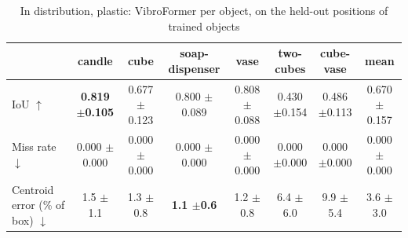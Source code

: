 \begin{table}
\caption{In distribution, plastic: VibroFormer per object, on the held-out positions of trained objects}
\label{tab:id_plastic}
\begin{tabular}{l!{\vrule width 1.2pt}cccccc!{\vrule width 1.2pt}c}
\toprule
 & candle & cube & soap-dispenser & vase & two-cubes & cube-vase & mean \\
\midrule
IoU $\uparrow$ & \bfseries 0.819 {\scriptsize $\pm$0.105} & 0.677 {\scriptsize $\pm$0.123} & 0.800 {\scriptsize $\pm$0.089} & 0.808 {\scriptsize $\pm$0.088} & 0.430 {\scriptsize $\pm$0.154} & 0.486 {\scriptsize $\pm$0.113} & 0.670 {\scriptsize $\pm$0.157} \\
Miss rate $\downarrow$ & 0.000 {\scriptsize $\pm$0.000} & 0.000 {\scriptsize $\pm$0.000} & 0.000 {\scriptsize $\pm$0.000} & 0.000 {\scriptsize $\pm$0.000} & 0.000 {\scriptsize $\pm$0.000} & 0.000 {\scriptsize $\pm$0.000} & 0.000 {\scriptsize $\pm$0.000} \\
Centroid error (\% of box) $\downarrow$ & 1.5 {\scriptsize $\pm$1.1} & 1.3 {\scriptsize $\pm$0.8} & \bfseries 1.1 {\scriptsize $\pm$0.6} & 1.2 {\scriptsize $\pm$0.8} & 6.4 {\scriptsize $\pm$6.0} & 9.9 {\scriptsize $\pm$5.4} & 3.6 {\scriptsize $\pm$3.0} \\
\bottomrule
\end{tabular}
\end{table}
